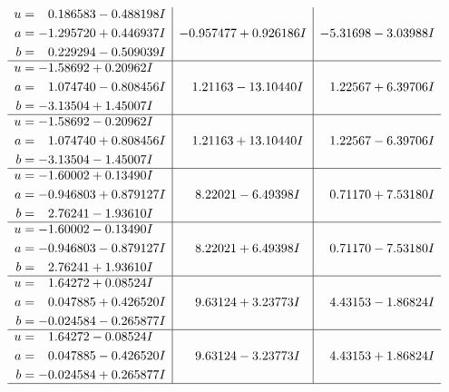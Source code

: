 \documentclass[1p]{elsarticle_modified}
\theoremstyle{definition}
\begin{document}
$$\begin{array}{c|c|c}
\begin{aligned}
u &= \phantom{-}0.186583 - 0.488198 I \\
a &= -1.295720 + 0.446937 I \\
b &= \phantom{-}0.229294 - 0.509039 I\end{aligned}
 & -0.957477 + 0.926186 I & -5.31698 - 3.03988 I \\ \hline\begin{aligned}
u &= -1.58692 + 0.20962 I \\
a &= \phantom{-}1.074740 - 0.808456 I \\
b &= -3.13504 + 1.45007 I\end{aligned}
 & \phantom{-}1.21163 - 13.10440 I & \phantom{-}1.22567 + 6.39706 I \\ \hline\begin{aligned}
u &= -1.58692 - 0.20962 I \\
a &= \phantom{-}1.074740 + 0.808456 I \\
b &= -3.13504 - 1.45007 I\end{aligned}
 & \phantom{-}1.21163 + 13.10440 I & \phantom{-}1.22567 - 6.39706 I \\ \hline\begin{aligned}
u &= -1.60002 + 0.13490 I \\
a &= -0.946803 + 0.879127 I \\
b &= \phantom{-}2.76241 - 1.93610 I\end{aligned}
 & \phantom{-}8.22021 - 6.49398 I & \phantom{-}0.71170 + 7.53180 I \\ \hline\begin{aligned}
u &= -1.60002 - 0.13490 I \\
a &= -0.946803 - 0.879127 I \\
b &= \phantom{-}2.76241 + 1.93610 I\end{aligned}
 & \phantom{-}8.22021 + 6.49398 I & \phantom{-}0.71170 - 7.53180 I \\ \hline\begin{aligned}
u &= \phantom{-}1.64272 + 0.08524 I \\
a &= \phantom{-}0.047885 + 0.426520 I \\
b &= -0.024584 - 0.265877 I\end{aligned}
 & \phantom{-}9.63124 + 3.23773 I & \phantom{-}4.43153 - 1.86824 I \\ \hline\begin{aligned}
u &= \phantom{-}1.64272 - 0.08524 I \\
a &= \phantom{-}0.047885 - 0.426520 I \\
b &= -0.024584 + 0.265877 I\end{aligned}
 & \phantom{-}9.63124 - 3.23773 I & \phantom{-}4.43153 + 1.86824 I\\
 \hline 
 \end{array}$$\newpage\newpage\renewcommand{\arraystretch}{1}
\end{document}
